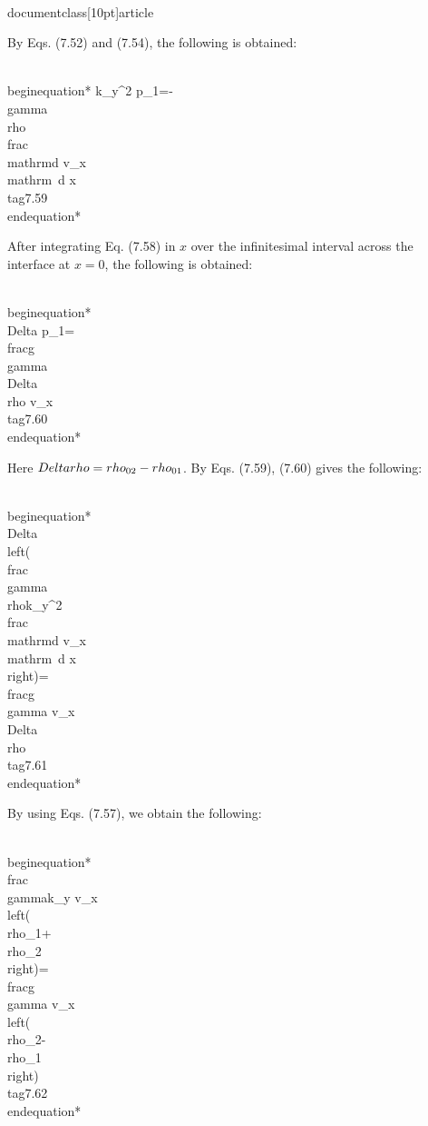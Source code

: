 \\documentclass[10pt]{article}
\begin{document}
{{{{By Eqs. (7.52) and (7.54), the following is obtained:


\\begin{equation*}
k_{y}^{2} p_{1}=-\\gamma \\rho \\frac{\\mathrm{d} v_{x}}{\\mathrm{~d} x} \\tag{7.59}
\\end{equation*}


After integrating Eq. (7.58) in $x$ over the infinitesimal interval across the interface at $x=0$, the following is obtained:


\\begin{equation*}
\\Delta p_{1}=\\frac{g}{\\gamma} \\Delta \\rho v_{x} \\tag{7.60}
\\end{equation*}


Here $\\Delta \\rho=\\rho_{02}-\\rho_{01}$. By Eqs. (7.59), (7.60) gives the following:


\\begin{equation*}
\\Delta\\left(\\frac{\\gamma \\rho}{k_{y}^{2}} \\frac{\\mathrm{d} v_{x}}{\\mathrm{~d} x}\\right)=\\frac{g}{\\gamma} v_{x} \\Delta \\rho \\tag{7.61}
\\end{equation*}


By using Eqs. (7.57), we obtain the following:


\\begin{equation*}
\\frac{\\gamma}{k_{y}} v_{x}\\left(\\rho_{1}+\\rho_{2}\\right)=\\frac{g}{\\gamma} v_{x}\\left(\\rho_{2}-\\rho_{1}\\right) \\tag{7.62}
\\end{equation*}


}}}}
\end{document}
